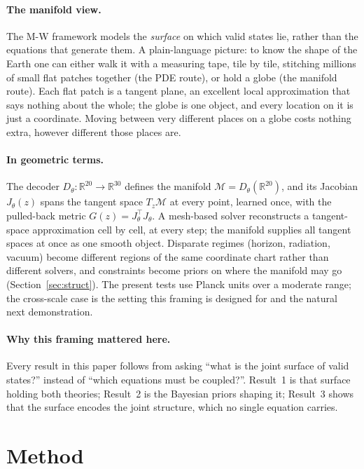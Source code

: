 \documentclass[10pt,twocolumn]{article}
\begin{document}
\paragraph{The manifold view.} The M-W framework models the \emph{surface} on which valid states
lie, rather than the equations that generate them. A plain-language picture: to know the shape
of the Earth one can either walk it with a measuring tape, tile by tile, stitching millions of
small flat patches together (the PDE route), or hold a globe (the manifold route). Each flat patch
is a tangent plane, an excellent local approximation that says nothing about the whole; the globe
is one object, and every location on it is just a coordinate. Moving between very different
places on a globe costs nothing extra, however different those places are.

\paragraph{In geometric terms.} The decoder $D_\theta:\mathbb R^{20}\to\mathbb R^{30}$ defines the
manifold $\mathcal M=D_\theta(\mathbb R^{20})$, and its Jacobian $J_\theta(z)$ spans the tangent
space $T_z\mathcal M$ at every point, learned once, with the pulled-back metric
$G(z)=J_\theta^\top J_\theta$. A mesh-based solver reconstructs a tangent-space approximation
cell by cell, at every step; the manifold supplies all tangent spaces at once as one smooth
object. Disparate regimes (horizon, radiation, vacuum) become different regions of the same
coordinate chart rather than different solvers, and constraints become priors on where the
manifold may go (Section~\ref{sec:struct}). The present tests use Planck units over a moderate
range; the cross-scale case is the setting this framing is designed for and the natural next
demonstration.

\paragraph{Why this framing mattered here.} Every result in this paper follows from asking
``what is the joint surface of valid states?'' instead of ``which equations must be coupled?''.
Result~1 is that surface holding both theories; Result~2 is the Bayesian priors shaping it;
Result~3 shows that the surface encodes the joint structure, which no single equation carries.

\section{Method}
\end{document}
